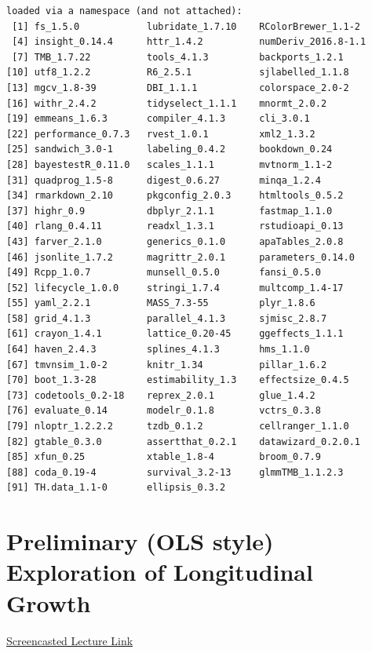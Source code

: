 \documentclass[
  11pt,
]{book}
\begin{document}
\begin{verbatim}
loaded via a namespace (and not attached):
 [1] fs_1.5.0            lubridate_1.7.10    RColorBrewer_1.1-2 
 [4] insight_0.14.4      httr_1.4.2          numDeriv_2016.8-1.1
 [7] TMB_1.7.22          tools_4.1.3         backports_1.2.1    
[10] utf8_1.2.2          R6_2.5.1            sjlabelled_1.1.8   
[13] mgcv_1.8-39         DBI_1.1.1           colorspace_2.0-2   
[16] withr_2.4.2         tidyselect_1.1.1    mnormt_2.0.2       
[19] emmeans_1.6.3       compiler_4.1.3      cli_3.0.1          
[22] performance_0.7.3   rvest_1.0.1         xml2_1.3.2         
[25] sandwich_3.0-1      labeling_0.4.2      bookdown_0.24      
[28] bayestestR_0.11.0   scales_1.1.1        mvtnorm_1.1-2      
[31] quadprog_1.5-8      digest_0.6.27       minqa_1.2.4        
[34] rmarkdown_2.10      pkgconfig_2.0.3     htmltools_0.5.2    
[37] highr_0.9           dbplyr_2.1.1        fastmap_1.1.0      
[40] rlang_0.4.11        readxl_1.3.1        rstudioapi_0.13    
[43] farver_2.1.0        generics_0.1.0      apaTables_2.0.8    
[46] jsonlite_1.7.2      magrittr_2.0.1      parameters_0.14.0  
[49] Rcpp_1.0.7          munsell_0.5.0       fansi_0.5.0        
[52] lifecycle_1.0.0     stringi_1.7.4       multcomp_1.4-17    
[55] yaml_2.2.1          MASS_7.3-55         plyr_1.8.6         
[58] grid_4.1.3          parallel_4.1.3      sjmisc_2.8.7       
[61] crayon_1.4.1        lattice_0.20-45     ggeffects_1.1.1    
[64] haven_2.4.3         splines_4.1.3       hms_1.1.0          
[67] tmvnsim_1.0-2       knitr_1.34          pillar_1.6.2       
[70] boot_1.3-28         estimability_1.3    effectsize_0.4.5   
[73] codetools_0.2-18    reprex_2.0.1        glue_1.4.2         
[76] evaluate_0.14       modelr_0.1.8        vctrs_0.3.8        
[79] nloptr_1.2.2.2      tzdb_0.1.2          cellranger_1.1.0   
[82] gtable_0.3.0        assertthat_0.2.1    datawizard_0.2.0.1 
[85] xfun_0.25           xtable_1.8-4        broom_0.7.9        
[88] coda_0.19-4         survival_3.2-13     glmmTMB_1.1.2.3    
[91] TH.data_1.1-0       ellipsis_0.3.2     
\end{verbatim}

\hypertarget{MLMexplore}{%
\chapter{Preliminary (OLS style) Exploration of Longitudinal Growth}\label{MLMexplore}}

\href{https://spu.hosted.panopto.com/Panopto/Pages/Viewer.aspx?pid=36075f1d-b805-40b9-92da-ad2b0053f46c}{Screencasted Lecture Link}
\end{document}
